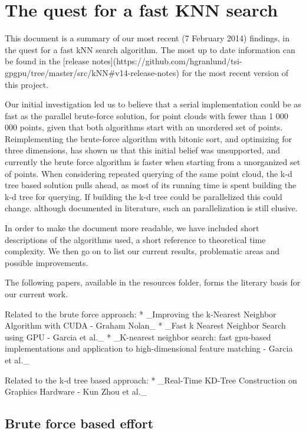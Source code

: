 
\section{The quest for a fast KNN search} %
\label{sec:the_quest_for_a_fast_KNN_search}

This document is a summary of our most recent (7 February 2014) findings, in the quest for a fast kNN search algorithm. The most up to date information can be found in the [release notes](https://github.com/hgranlund/tsi-gpgpu/tree/master/src/kNN#v14-release-notes) for the most recent version of this project.

Our initial investigation led us to believe that a serial implementation could be as fast as the parallel brute-force solution, for point clouds with fewer than 1 000 000 points, given that both algorithms start with an unordered set of points. Reimplementing the brute-force algorithm with bitonic sort, and optimizing for three dimensions, has shown us that this initial belief was unsupported, and currently the brute force algorithm is faster when starting from a unorganized set of points. When considering repeated querying of the same point cloud, the k-d tree based solution pulls ahead, as most of its running time is spent building the k-d tree for querying. If building the k-d tree could be parallelized this could change. although documented in literature, such an parallelization is still elusive.

In order to make the document more readable, we have included short descriptions of the algorithms used, a short reference to theoretical time complexity. We then go on to list our current results, problematic areas and possible improvements.

The following papers, available in the resources folder, forms the literary basis for our current work.

Related to the brute force approach:
* _Improving the k-Nearest Neighbor Algorithm with CUDA - Graham Nolan_
* _Fast k Nearest Neighbor Search using GPU - Garcia et al._
* _K-nearest neighbor search: fast gpu-based implementations and application to high-dimensional feature matching - Garcia et al._

Related to the k-d tree based approach:
* _Real-Time KD-Tree Construction on Graphics Hardware - Kun Zhou et al._

\subsection{Brute force based effort} %
\label{sub:brute_force_based_effort}

